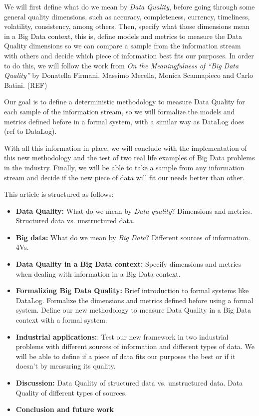 \documentclass[%
 reprint,
 amsmath,amssymb,
 aps,
]{revtex4-1}
\begin{document}
We will first define what do we mean by \emph{Data Quality}, before going through some general quality dimensions, such as accuracy, completeness, currency, timeliness, volatility, consistency, among others. Then, specify what those dimensions mean in a Big Data context, this is, define models and metrics to measure the  Data Quality dimensions so we can compare a sample from the information stream with others and decide which piece of information best fits our purposes. In order to do this, we will follow the work from \emph{On the Meaningfulness of “Big Data Quality”} by Donatella Firmani, Massimo Mecella, Monica Scannapieco and Carlo Batini. (REF)

Our goal is to define a deterministic methodology to measure Data Quality for each sample of the information stream, so we will formalize the models and metrics defined before in a formal system, with a similar way as DataLog does (ref to DataLog).

With all this information in place, we will conclude with the implementation of this new methodology and the test of two real life examples of Big Data problems in the industry. Finally, we will be able to take a sample from any information stream and decide if the new piece of data will fit our needs better than other.

This article is structured as follows:
\begin{itemize}
  \item \textbf{Data Quality:} What do we mean by \emph{Data quality}? Dimensions and metrics. Structured data vs. unstructured data.
  \item \textbf{Big data:} What do we mean by \emph{Big Data}? Different sources of information. 4Vs.
  \item \textbf{Data Quality in a Big Data context:} Specify dimensions and metrics when dealing with information in a Big Data context.
  \item \textbf{Formalizing Big Data Quality:} Brief introduction to formal systems like DataLog. Formalize the dimensions and metrics defined before using a formal system. Define our new methodology to measure Data Quality in a Big Data context with a formal system.
  \item \textbf{Industrial applications:}: Test our new framework in two industrial problems with different sources of information and different types of data. We will be able to define if a piece of data fits our purposes the best or if it doesn't by measuring its quality.
  \item \textbf{Discussion:} Data Quality of structured data vs. unstructured data. Data Quality of different types of sources.
  \item \textbf{Conclusion and future work}
\end{itemize}
\end{document}

